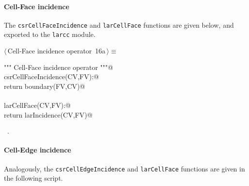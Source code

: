 \documentclass[11pt,oneside]{article}	%
\begin{document}
\paragraph{Cell-Face incidence}
The \texttt{csrCellFaceIncidence} and \texttt{larCellFace} functions are given below, and exported to the \texttt{larcc} module.
\begin{flushleft} \small \label{scrap27}
\protect{}$\langle\,$Cell-Face incidence operator\nobreak\ {\footnotesize 16a}$\,\rangle\equiv$
\vspace{-1ex}
\begin{list}{}{} \item
\mbox{}\verb@""" Cell-Face incidence operator """@\\
\mbox{}\verb@def csrCellFaceIncidence(CV,FV):@\\
\mbox{}\verb@   return boundary(FV,CV)@\\
\mbox{}\verb@@\\
\mbox{}\verb@def larCellFace(CV,FV):@\\
\mbox{}\verb@   return larIncidence(CV,FV)@\\
\mbox{}\verb@@{\NWsep}
\end{list}
\vspace{-1ex}
\footnotesize\addtolength{\baselineskip}{-1ex}
\begin{list}{}{\setlength{\itemsep}{-\parsep}\setlength{\itemindent}{-\leftmargin}}
\item \NWtxtMacroRefIn\ .
\end{list}
\end{flushleft}

\paragraph{Cell-Edge incidence}
Analogously, the \texttt{csrCellEdgeIncidence} and \texttt{larCellFace} functions are given in the following script.
\end{document}
